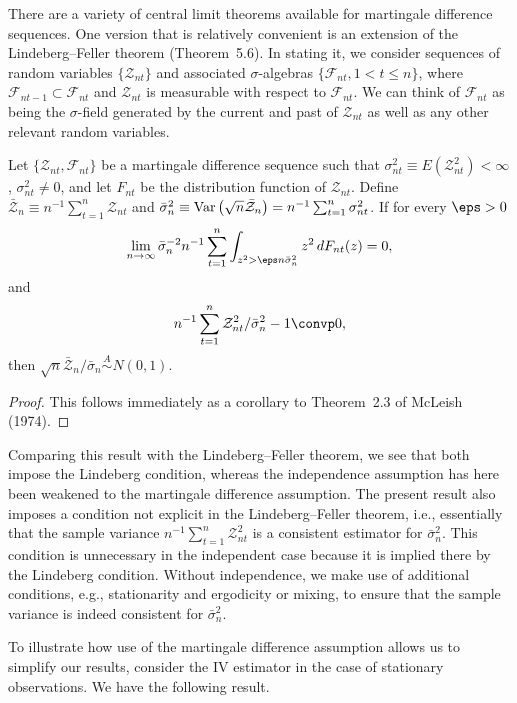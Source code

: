 There are a variety of central limit theorems available for martingale difference sequences. One version that is relatively convenient is an extension of the Lindeberg--Feller theorem (Theorem~5.6). In stating it, we consider sequences of random variables $\{\mathcal{Z}_{nt}\}$ and associated $\sigma$-algebras $\{\mathcal{F}_{nt}, 1 < t \leq n\}$, where $\mathcal{F}_{nt-1} \subset \mathcal{F}_{nt}$ and $\mathcal{Z}_{nt}$ is measurable with respect to $\mathcal{F}_{nt}$. We can think of $\mathcal{F}_{nt}$ as being the $\sigma$-field generated by the current and past of $\mathcal{Z}_{nt}$ as well as any other relevant random variables.

\begin{theorem}\label{thm:mds-clt}
Let $\{\mathcal{Z}_{nt}, \mathcal{F}_{nt}\}$ be a martingale difference sequence such that $\sigma_{nt}^2 \equiv E(\mathcal{Z}_{nt}^2) < \infty$, $\sigma_{nt}^2 \neq 0$, and let $F_{nt}$ be the distribution function of $\mathcal{Z}_{nt}$. Define $\bar{\mathcal{Z}}_n \equiv n^{-1}\sum_{t=1}^{n}\mathcal{Z}_{nt}$ and $\bar{\sigma}_n^2 \equiv \operatorname{Var}\left(\sqrt{n}\bar{\mathcal{Z}}_n\right) = n^{-1}\sum_{t=1}^{n}\sigma_{nt}^2$. If for every $\eps > 0$
\[
\lim_{n \to \infty}\bar{\sigma}_n^{-2}n^{-1}\sum_{t=1}^{n}\int_{z^2 > \eps n\bar{\sigma}_n^2} z^2\,dF_{nt}(z) = 0,
\]
and
\[
n^{-1}\sum_{t=1}^{n}\mathcal{Z}_{nt}^2/\bar{\sigma}_n^2 - 1 \convp 0,
\]
then $\sqrt{n}\bar{\mathcal{Z}}_n/\bar{\sigma}_n \overset{A}{\sim} N(0,1)$.
\end{theorem}

\begin{proof}
This follows immediately as a corollary to Theorem~2.3 of McLeish (1974).
\end{proof}

Comparing this result with the Lindeberg--Feller theorem, we see that both impose the Lindeberg condition, whereas the independence assumption has here been weakened to the martingale difference assumption. The present result also imposes a condition not explicit in the Lindeberg--Feller theorem, i.e., essentially that the sample variance $n^{-1}\sum_{t=1}^{n}\mathcal{Z}_{nt}^2$ is a consistent estimator for $\bar{\sigma}_n^2$. This condition is unnecessary in the independent case because it is implied there by the Lindeberg condition. Without independence, we make use of additional conditions, e.g., stationarity and ergodicity or mixing, to ensure that the sample variance is indeed consistent for $\bar{\sigma}_n^2$.

To illustrate how use of the martingale difference assumption allows us to simplify our results, consider the IV estimator in the case of stationary observations. We have the following result.

